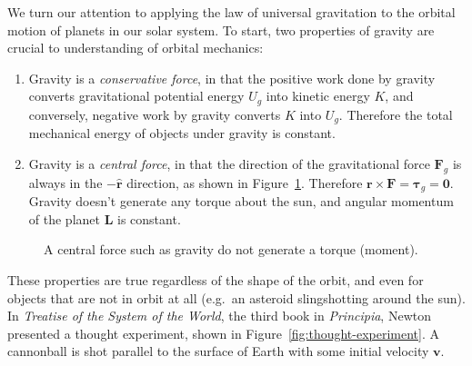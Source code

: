 We turn our attention to applying the law of universal gravitation to the
orbital motion of planets in our solar system. To start, two properties of
gravity are crucial to understanding of orbital mechanics:
\begin{enumerate}
\item Gravity is a \emph{conservative force},
  in that the positive work done by gravity converts gravitational potential
  energy $U_g$ into kinetic energy $K$, and conversely, negative work by
  gravity converts $K$ into $U_g$. Therefore the total mechanical energy of
  objects under gravity is constant.

\item Gravity is a \emph{central force}, in that the direction of the
  gravitational force $\bm F_g$ is always in the $-\hat{\bm r}$ direction, as
  shown in Figure~\ref{central-force}. Therefore
  $\bm r\times\bm F=\bm\tau_g=\bm 0$. Gravity doesn't generate any torque
  about the sun, and angular momentum of the planet $\bm L$ is constant.
\end{enumerate}
\begin{figure}[!ht]
  \centering
  \caption{A central force such as gravity do not generate a torque (moment).}
  \label{central-force}
\end{figure}
These properties are true regardless of the shape of the orbit, and even for
objects that are not in orbit at all (e.g.\ an asteroid slingshotting around
the sun). In \emph{Treatise of the System of the World}, the third book in
\emph{Principia}, Newton presented a thought experiment, shown in
Figure~\ref{fig:thought-experiment}. A cannonball is shot parallel to the surface
of Earth with some initial velocity $\bm v$.
